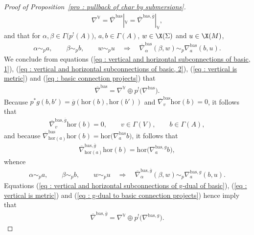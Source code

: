 \begin{proof}[Proof of Proposition~\ref{pro : pullback of char by submersions}]
 \begin{gather}\label{eq : vertical is metric}
 \nabla^{\mathbb{V}}=\overline{\nabla}^{\mathrm{bas}}|_{\mathbb{V}} = \overline{\nabla}^{\mathrm{bas},\overline{g}}|_{\mathbb{V}},
 \end{gather}and that for $\alpha,\beta \in \Gamma\big(p^!(A)\big)$, $a,b \in \Gamma(A)$, $w \in \X(\Sigma)$ and $u \in \X(M)$,
\begin{gather}\label{eq : basic connection projects}
 \alpha \sim_p a, \qquad \beta \sim_p b, \qquad w \sim_p u \quad \Longrightarrow \quad \overline{\nabla}^{\mathrm{bas}}_{\alpha}(\beta,w) \sim_p \nabla^{\mathrm{bas}}_{a}(b,u).
\end{gather}We conclude from equations (\ref{eq : vertical and horizontal subconnections of basic, 1}), (\ref{eq : vertical and horizontal subconnections of basic, 2}), (\ref{eq : vertical is metric}) and (\ref{eq : basic connection projects}) that
\begin{gather}\label{eq : basic connection splits}
 \overline{\nabla}^{\mathrm{bas}} = \nabla^{\mathbb{V}} \oplus p^!\big(\nabla^{\mathrm{bas}}\big).
\end{gather}Because $p^*g(b,b')=\overline{g}(\mathrm{hor}(b),\mathrm{hor}(b'))$ and $\overline{\nabla}^{\mathrm{bas}}_v\mathrm{hor}(b)=0$, it follows that
\begin{gather*}
 \overline{\nabla}^{\mathrm{bas},\overline{g}}_v\mathrm{hor}(b) = 0, \qquad v \in \Gamma(V), \qquad b \in \Gamma(A),
\end{gather*}and because $\overline{\nabla}^{\mathrm{bas}}_{\mathrm{hor}(a)}\mathrm{hor}(b) = \mathrm{hor}\big(\nabla^{\mathrm{bas}}_{a}b\big)$, it follows that
\begin{gather*}
 \overline{\nabla}^{\mathrm{bas},\overline{g}}_{\mathrm{hor}(a)}\mathrm{hor}(b) = \mathrm{hor}\big(\nabla^{\mathrm{bas},g}_{a}b\big),
\end{gather*}whence
\begin{gather}\label{eq : g-dual to basic connection projects}
 \alpha \sim_p a, \qquad \beta \sim_p b, \qquad w \sim_p u \quad \Longrightarrow \quad \overline{\nabla}^{\mathrm{bas},\overline{g}}_{\alpha}(\beta,w) \sim_p \nabla^{\mathrm{bas},g}_{a}(b,u).
\end{gather}Equations (\ref{eq : vertical and horizontal subconnections of g-dual of basic}), (\ref{eq : vertical is metric}) and (\ref{eq : g-dual to basic connection projects}) hence imply that
\begin{gather}\label{eq : g-dual to basic connection splits}
 \overline{\nabla}^{\mathrm{bas},\overline{g}} = \nabla^{\mathbb{V}} \oplus p^!\big(\nabla^{\mathrm{bas},g}\big).
\end{gather}


\end{proof}
